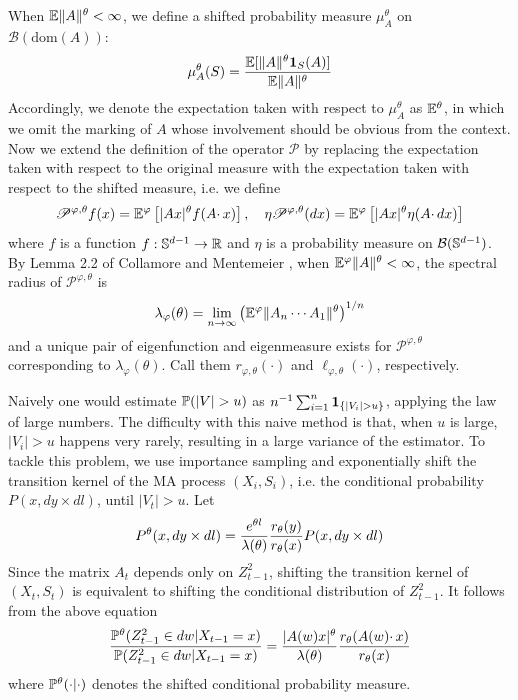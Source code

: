 \documentclass[aoas,preprint]{imsart}
\numberwithin{equation}{section}
\theoremstyle{plain}
\begin{document}
When $\E \|A\|^\theta < \infty$, we define a shifted probability
measure $\mu_A^\theta$ on $\mathcal B(\text{dom}(A))$:
\[
\mu_A^\theta(S) = {
  \E [ \| A \|^\theta \I_S(A)]
  \over
  \E \|A\|^\theta
}
\]
Accordingly, we denote the expectation taken with respect to
$\mu_A^\theta$ as $\E^\theta$, in which we omit the marking of $A$
whose involvement should be obvious from the context.
Now we extend the definition of the operator $\mathscr P$ by replacing
the expectation taken with respect to the original measure with the
expectation taken with respect to the shifted measure, i.e. we
define
\[
\mathscr P^{\varphi, \theta} f(x)
= \E^\varphi \left[
  |A x|^\theta f(A \cdotp x)
\right], \quad
\eta \mathscr P^{\varphi, \theta}(dx)
=
\E^\varphi \left[ |A x|^\theta \eta(A \cdotp dx) \right]
\]
where $f$ is a function $f: \sphere^{d-1} \to \reals$ and
$\eta$ is a probability measure on $\mathcal B(\sphere^{d-1})$.
By Lemma 2.2 of Collamore and Mentemeier
\cite{collamore:mentemeier:2016}, when
$\E^\varphi \| A \|^\theta < \infty$, the spectral radius of
$\mathscr P^{\varphi, \theta}$ is
\[
\lambda_\varphi(\theta) = \lim_{n \to \infty}
\left(\E^\varphi \|A_n \cdots A_1 \|^\theta\right)^{1/n}
\]
and a unique pair of eigenfunction and eigenmeasure exists
for $\mathscr P^{\varphi, \theta}$ corresponding to
$\lambda_\varphi(\theta)$. Call them
$r_{\varphi, \theta}(\cdot)$ and $\ell_{\varphi, \theta}(\cdot)$,
respectively.

Naively one would estimate $\P(|V| > u)$ as
$n^{-1} \sum_{i=1}^n \1{|V_i| > u}$, applying the law of large
numbers. The difficulty with this naive method is that, when $u$ is
large, $|V_i| > u$ happens very rarely, resulting in a large variance
of the estimator. To tackle this problem, we use importance sampling
and exponentially shift the transition kernel of the MA process
$(X_i, S_i)$, i.e. the conditional probability $P(x, dy \times dl)$,
until $|V_t| > u$. Let
\[
P^\theta(x, dy \times dl)
=
{e^{\theta l} \over \lambda(\theta)}
{r_\theta(y) \over r_\theta(x)}
P(x, dy \times dl)
\]
Since the matrix $A_t$ depends only on $Z_{t-1}^2$, shifting the
transition kernel of $(X_t, S_t)$ is equivalent to shifting the
conditional distribution of $Z_{t-1}^2$. It follows from the above
equation
\[
{
  \P^\theta(Z_{t-1}^2 \in dw | X_{t-1} = x)
  \over
  \P(Z_{t-1}^2 \in dw | X_{t-1} = x)
} = {|A(w) x|^\theta \over \lambda(\theta)}
{
  r_\theta (A(w) \cdotp x)
  \over
  r_\theta(x)
}
\]
where $\P^\theta(\cdot | \cdot)$ denotes the shifted conditional
probability measure.
\end{document}
